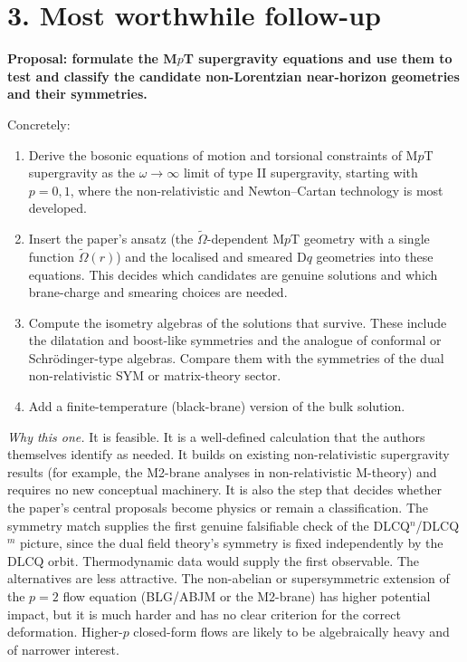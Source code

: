 \documentclass[11pt]{article}
\begin{document}
\section*{3. Most worthwhile follow-up}
\textbf{Proposal: formulate the M$p$T supergravity equations and use them to test and classify the candidate non-Lorentzian near-horizon geometries and their symmetries.}

Concretely:
\begin{enumerate}
\item Derive the bosonic equations of motion and torsional constraints of M$p$T supergravity as the $\omega\to\infty$ limit of type II supergravity, starting with $p=0,1$, where the non-relativistic and Newton--Cartan technology is most developed.
\item Insert the paper's ansatz (the $\tilde{\mathbb\Omega}$-dependent M$p$T geometry with a single function $\tilde{\mathbb\Omega}(r)$) and the localised and smeared $\mathrm{D}q$ geometries into these equations. This decides which candidates are genuine solutions and which brane-charge and smearing choices are needed.
\item Compute the isometry algebras of the solutions that survive. These include the dilatation and boost-like symmetries and the analogue of conformal or Schr\"odinger-type algebras. Compare them with the symmetries of the dual non-relativistic SYM or matrix-theory sector.
\item Add a finite-temperature (black-brane) version of the bulk solution.
\end{enumerate}

\emph{Why this one.} It is feasible. It is a well-defined calculation that the authors themselves identify as needed. It builds on existing non-relativistic supergravity results (for example, the M2-brane analyses in non-relativistic M-theory) and requires no new conceptual machinery. It is also the step that decides whether the paper's central proposals become physics or remain a classification. The symmetry match supplies the first genuine falsifiable check of the DLCQ$^n$/DLCQ$^m$ picture, since the dual field theory's symmetry is fixed independently by the DLCQ orbit. Thermodynamic data would supply the first observable. The alternatives are less attractive. The non-abelian or supersymmetric extension of the $p=2$ flow equation (BLG/ABJM or the M2-brane) has higher potential impact, but it is much harder and has no clear criterion for the correct deformation. Higher-$p$ closed-form flows are likely to be algebraically heavy and of narrower interest.
\end{document}
